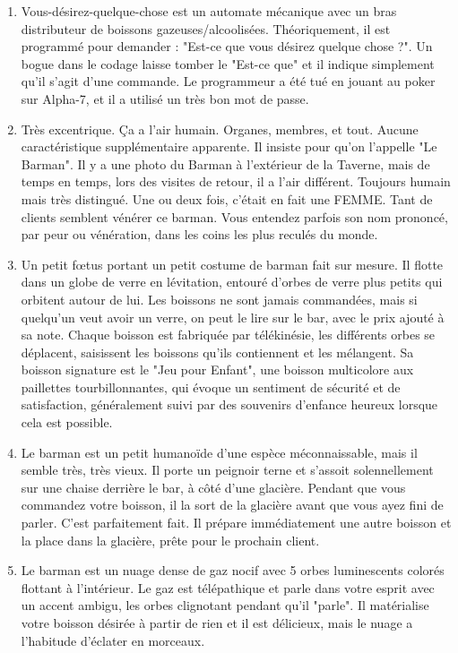 \documentclass{article}
\begin{document}
\begin{enumerate}
	\item Vous-désirez-quelque-chose est un automate mécanique avec un bras distributeur de boissons gazeuses/alcoolisées. Théoriquement, il est programmé pour demander : "Est-ce que vous désirez quelque chose ?". Un bogue dans le codage laisse tomber le "Est-ce que" et il indique simplement qu'il s'agit d'une commande. Le programmeur a été tué en jouant au poker sur Alpha-7, et il a utilisé un très bon mot de passe.
	\item Très excentrique. Ça a l'air humain. Organes, membres, et tout. Aucune caractéristique supplémentaire apparente. Il insiste pour qu'on l'appelle "Le Barman". Il y a une photo du Barman à l'extérieur de la Taverne, mais de temps en temps, lors des visites de retour, il a l'air différent. Toujours humain mais très distingué. Une ou deux fois, c'était en fait une FEMME. Tant de clients semblent vénérer ce barman. Vous entendez parfois son nom prononcé, par peur ou vénération, dans les coins les plus reculés du monde.
	\item Un petit fœtus portant un petit costume de barman fait sur mesure. Il flotte dans un globe de verre en lévitation, entouré d'orbes de verre plus petits qui orbitent autour de lui. Les boissons ne sont jamais commandées, mais si quelqu'un veut avoir un verre, on peut le lire sur le bar, avec le prix ajouté à sa note. Chaque boisson est fabriquée par télékinésie, les différents orbes se déplacent, saisissent les boissons qu'ils contiennent et les mélangent. Sa boisson signature est le "Jeu pour Enfant", une boisson multicolore aux paillettes tourbillonnantes, qui évoque un sentiment de sécurité et de satisfaction, généralement suivi par des souvenirs d'enfance heureux lorsque cela est possible.
	\item Le barman est un petit humanoïde d'une espèce méconnaissable, mais il semble très, très vieux. Il porte un peignoir terne et s'assoit solennellement sur une chaise derrière le bar, à côté d'une glacière. Pendant que vous commandez votre boisson, il la sort de la glacière avant que vous ayez fini de parler. C'est parfaitement fait. Il prépare immédiatement une autre boisson et la place dans la glacière, prête pour le prochain client.
	\item Le barman est un nuage dense de gaz nocif avec 5 orbes luminescents colorés flottant à l'intérieur. Le gaz est télépathique et parle dans votre esprit avec un accent ambigu, les orbes clignotant pendant qu'il "parle". Il matérialise votre boisson désirée à partir de rien et il est délicieux, mais le nuage a l'habitude d'éclater en morceaux.

\end{enumerate}
\end{document}
